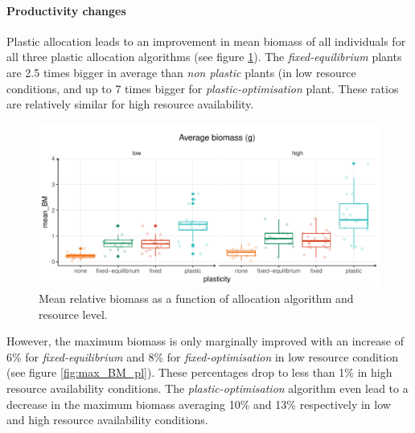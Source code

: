 \paragraph{Productivity changes}

Plastic allocation leads to an improvement in mean biomass of all individuals for all three plastic allocation algorithms (see figure \ref{fig:mean_BM_pl}). The \textit{fixed-equilibrium} plants are 2.5 times bigger in average than \textit{non plastic} plants (in low resource conditions, and up to 7 times bigger for \textit{plastic-optimisation} plant. These ratios are relatively similar for high resource availability. 

\begin{figure}\label{fig:mean_BM_pl}
\includegraphics[width = \textwidth]{./2_PP/Figures/Landscape/plot_BM_allocation.pdf}
\caption{Mean relative biomass as a function of allocation algorithm and resource level.}
\end{figure}

However, the maximum biomass is only marginally improved with an increase of 6\% for \textit{fixed-equilibrium} and 8\% for \textit{fixed-optimisation} in low resource condition (see figure \ref{fig:max_BM_pl}). These percentages drop to less than 1\% in high resource availability conditions. The \textit{plastic-optimisation} algorithm even lead to a decrease in the maximum biomass averaging 10\% and 13\% respectively in low and high resource availability conditions.

